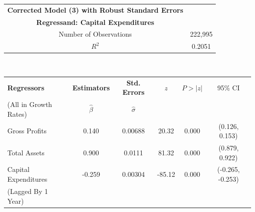 \begin{table}[h]
\begin{tabular}{ c | c }
	\hline
	\textbf{Corrected Model (3) with Robust Standard Errors} \\
    \textbf{Regressand: Capital Expenditures} \\
    \hline \hline
    Number of Observations & 222,995 \\
	\hline
    $R^{2}$ & 0.2051 \\
    \hline \hline
\end{tabular} \\

\begin{tabular}{ l | c | c | c | c | c }
	\hline
	\textbf{Regressors} & \textbf{Estimators} & \textbf{Std. Errors} & $z$ & $P > |z|$ & 95\% CI \\
    (All in Growth Rates) & $\hat{\beta}$ & $\hat{\sigma}$ & & & \\
    \hline \hline
	Gross Profits & 0.140 & 0.00688  & 20.32 & 0.000 & (0.126, 0.153) \\
	\hline
    Total Assets & 0.900 & 0.0111 & 81.32 & 0.000 & (0.879, 0.922)\\
    \hline
    Capital Expenditures & -0.259 & 0.00304 & -85.12 & 0.000 & (-0.265, -0.253) \\
    (Lagged By 1 Year) & & & & & \\
    \hline \hline
\end{tabular}
\end{table}

